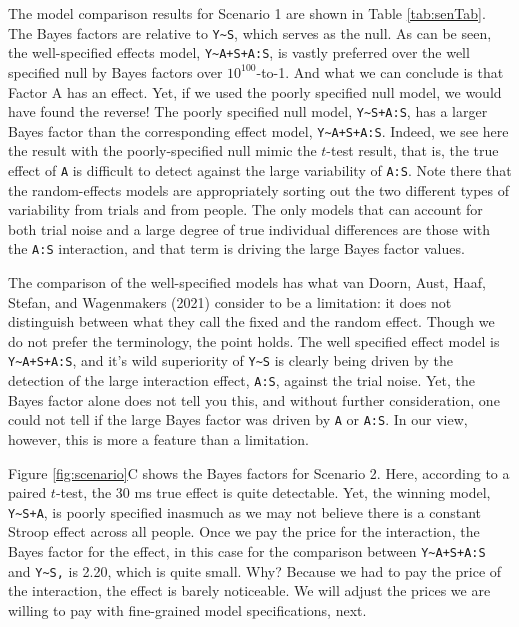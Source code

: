 \documentclass[
  english,
  ,man]{apa6}
\begin{document}
The model comparison results for Scenario 1 are shown in Table \ref{tab:senTab}. The Bayes factors are relative to \texttt{Y\textasciitilde{}S}, which serves as the null. As can be seen, the well-specified effects model, \texttt{Y\textasciitilde{}A+S+A:S}, is vastly preferred over the well specified null by Bayes factors over \(10^{100}\)-to-1. And what we can conclude is that Factor A has an effect. Yet, if we used the poorly specified null model, we would have found the reverse! The poorly specified null model, \texttt{Y\textasciitilde{}S+A:S}, has a larger Bayes factor than the corresponding effect model, \texttt{Y\textasciitilde{}A+S+A:S}. Indeed, we see here the result with the poorly-specified null mimic the \(t\)-test result, that is, the true effect of \texttt{A} is difficult to detect against the large variability of \texttt{A:S}. Note there that the random-effects models are appropriately sorting out the two different types of variability from trials and from people. The only models that can account for both trial noise and a large degree of true individual differences are those with the \texttt{A:S} interaction, and that term is driving the large Bayes factor values.

The comparison of the well-specified models has what van Doorn, Aust, Haaf, Stefan, and Wagenmakers (2021) consider to be a limitation: it does not distinguish between what they call the fixed and the random effect. Though we do not prefer the terminology, the point holds. The well specified effect model is \texttt{Y\textasciitilde{}A+S+A:S}, and it's wild superiority of \texttt{Y\textasciitilde{}S} is clearly being driven by the detection of the large interaction effect, \texttt{A:S}, against the trial noise. Yet, the Bayes factor alone does not tell you this, and without further consideration, one could not tell if the large Bayes factor was driven by \texttt{A} or \texttt{A:S}. In our view, however, this is more a feature than a limitation.

Figure \ref{fig:scenario}C shows the Bayes factors for Scenario 2. Here, according to a paired \(t\)-test, the 30 ms true effect is quite detectable. Yet, the winning model, \texttt{Y\textasciitilde{}S+A}, is poorly specified inasmuch as we may not believe there is a constant Stroop effect across all people. Once we pay the price for the interaction, the Bayes factor for the effect, in this case for the comparison between \texttt{Y\textasciitilde{}A+S+A:S} and \texttt{Y\textasciitilde{}S,} is 2.20, which is quite small. Why? Because we had to pay the price of the interaction, the effect is barely noticeable. We will adjust the prices we are willing to pay with fine-grained model specifications, next.
\end{document}
